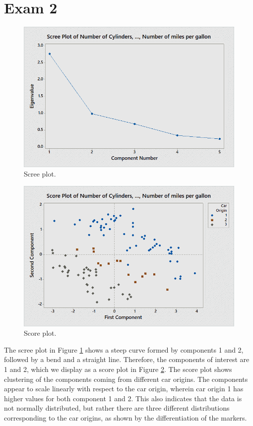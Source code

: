 \documentclass[12pt,a4paper]{article}
\begin{document}
\setcounter{page}{1}

\section*{Exam 2}

\begin{figure}[!h]
	\centering
	\includegraphics[width=0.7\linewidth]{pca-scree.png}
	\caption{Scree plot.}
	\label{fig:scree}
\end{figure}

\begin{figure}[!h]
	\centering
	\includegraphics[width=0.7\linewidth]{pca-score.png}
	\caption{Score plot.}
	\label{fig:score}
\end{figure}

The scree plot in Figure \ref{fig:scree} shows a steep curve formed by components 1 and 2, followed by a bend and a straight line. Therefore, the components of interest are 1 and 2, which we display as a score plot in Figure \ref{fig:score}. The score plot shows clustering of the components coming from different car origins. The components appear to scale linearly with respect to the car origin, wherein car origin 1 has higher values for both component 1 and 2. This also indicates that the data is not normally distributed, but rather there are three different distributions corresponding to the car origins, as shown by the differentiation of the markers.
\end{document}
